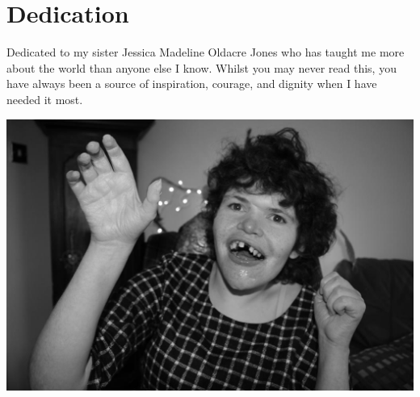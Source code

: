 \chapter*{Dedication}

\vfill

Dedicated to my sister Jessica Madeline Oldacre Jones who has taught me more about the world than anyone else I know. Whilst you may never read this, you have always been a source of inspiration, courage, and dignity when I have needed it most.

    \hfill
    \vfill
\begin{center}
\includegraphics[width=14cm]{figures/Jessie.jpg}\\
\end{center}
